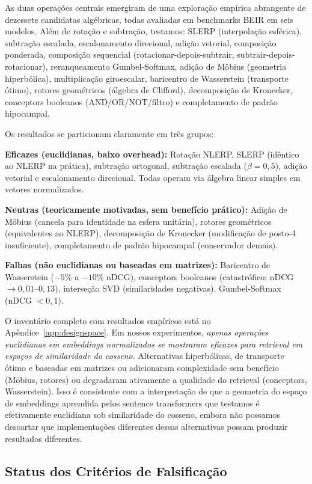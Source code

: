 \documentclass{article}
\begin{document}
As duas operações centrais emergiram de uma exploração empírica abrangente de dezessete candidatas algébricas, todas avaliadas em benchmarks BEIR em seis modelos. Além de rotação e subtração, testamos: SLERP (interpolação esférica), subtração escalada, escalonamento direcional, adição vetorial, composição ponderada, composição sequencial (rotacionar-depois-subtrair, subtrair-depois-rotacionar), reranqueamento Gumbel-Softmax, adição de M\"{o}bius (geometria hiperbólica), multiplicação giroescalar, baricentro de Wasserstein (transporte ótimo), rotores geométricos (álgebra de Clifford), decomposição de Kronecker, conceptors booleanos (AND/OR/NOT/filtro) e completamento de padrão hipocampal.

Os resultados se particionam claramente em três grupos:

\textbf{Eficazes (euclidianas, baixo overhead):} Rotação NLERP, SLERP (idêntico ao NLERP na prática), subtração ortogonal, subtração escalada ($\beta = 0{,}5$), adição vetorial e escalonamento direcional. Todas operam via álgebra linear simples em vetores normalizados.

\textbf{Neutras (teoricamente motivadas, sem benefício prático):} Adição de M\"{o}bius (cancela para identidade na esfera unitária), rotores geométricos (equivalentes ao NLERP), decomposição de Kronecker (modificação de posto-4 insuficiente), completamento de padrão hipocampal (conservador demais).

\textbf{Falhas (não euclidianas ou baseadas em matrizes):} Baricentro de Wasserstein ($-5\%$ a $-10\%$ nDCG), conceptors booleanos (catastrófico: nDCG $\to 0{,}01$--$0{,}13$), interseção SVD (similaridades negativas), Gumbel-Softmax (nDCG $< 0{,}1$).

O inventário completo com resultados empíricos está no Apêndice~\ref{app:designspace}. Em nossos experimentos, \emph{apenas operações euclidianas em embeddings normalizados se mostraram eficazes para retrieval em espaços de similaridade do cosseno}. Alternativas hiperbólicas, de transporte ótimo e baseadas em matrizes ou adicionaram complexidade sem benefício (M\"{o}bius, rotores) ou degradaram ativamente a qualidade do retrieval (conceptors, Wasserstein). Isso é consistente com a interpretação de que a geometria do espaço de embeddings aprendida pelos sentence transformers que testamos é efetivamente euclidiana sob similaridade do cosseno, embora não possamos descartar que implementações diferentes dessas alternativas possam produzir resultados diferentes.

\subsection{Status dos Critérios de Falsificação}
\end{document}
